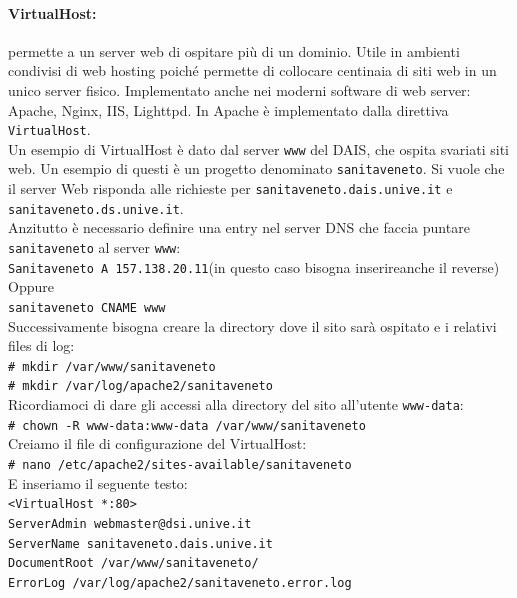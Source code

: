 \documentclass[a4paper]{report}
\newcommand\tab[1][1cm]{\hspace*{#1}}
\begin{document}
\paragraph{VirtualHost:} permette a un server web di ospitare più di un dominio. Utile in ambienti condivisi di web hosting poiché permette di collocare centinaia di siti web in un unico server fisico. Implementato anche nei moderni software di web server: Apache, Nginx, IIS, Lighttpd. In Apache è implementato dalla direttiva \texttt{VirtualHost}.\\
Un esempio di VirtualHost è dato dal server \texttt{www} del DAIS, che ospita svariati siti web. Un esempio di questi è un progetto denominato \texttt{sanitaveneto}. Si vuole che il server Web risponda alle richieste per \texttt{sanitaveneto.dais.unive.it} e \texttt{sanitaveneto.ds.unive.it}.\\
Anzitutto è necessario definire una entry nel server DNS che faccia puntare \texttt{sanitaveneto} al server \texttt{www}:\\
\tab\texttt{Sanitaveneto A 157.138.20.11}\tab (in questo caso bisogna inserire\tab anche il reverse)\\
Oppure\\
\tab\texttt{sanitaveneto CNAME www}\\
Successivamente bisogna creare la directory dove il sito sarà ospitato e i relativi files di log:\\
\tab\texttt{\# mkdir /var/www/sanitaveneto}\\
\tab\texttt{\# mkdir /var/log/apache2/sanitaveneto}\\
Ricordiamoci di dare gli accessi alla directory del sito all'utente \texttt{www-data}:\\
\tab\texttt{\# chown -R www-data:www-data /var/www/sanitaveneto}\\
Creiamo il file di configurazione del VirtualHost:\\
\tab\texttt{\# nano /etc/apache2/sites-available/sanitaveneto}\\
E inseriamo il seguente testo:\\
\tab\texttt{<VirtualHost *:80>}\\
\tab\tab\texttt{ServerAdmin webmaster@dsi.unive.it}\\
\tab\tab\texttt{ServerName sanitaveneto.dais.unive.it}\\
\tab\tab\texttt{DocumentRoot /var/www/sanitaveneto/}\\
\tab\tab\texttt{ErrorLog /var/log/apache2/sanitaveneto.error.log}\\
\end{document}
